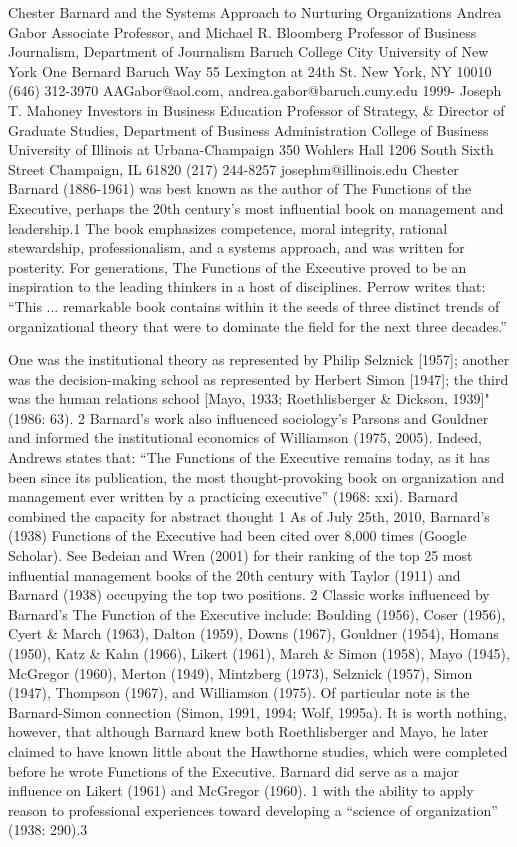 Chester Barnard and the Systems Approach to Nurturing Organizations Andrea Gabor Associate Professor, and Michael R. Bloomberg Professor of Business Journalism, Department of Journalism Baruch College City University of New York One Bernard Baruch Way 55 Lexington at 24th St. New York, NY 10010 (646) 312-3970 AAGabor@aol.com, andrea.gabor@baruch.cuny.edu 1999- Joseph T. Mahoney Investors in Business Education Professor of Strategy, \& Director of Graduate Studies, Department of Business Administration College of Business University of Illinois at Urbana-Champaign 350 Wohlers Hall 1206 South Sixth Street Champaign, IL 61820 (217) 244-8257 josephm@illinois.edu Chester Barnard (1886-1961) was best known as the author of The Functions of the Executive, perhaps the 20th century’s most influential book on management and leadership.1 The book emphasizes competence, moral integrity, rational stewardship, professionalism, and a systems approach, and was written for posterity. For generations, The Functions of the Executive proved to be an inspiration to the leading thinkers in a host of disciplines. Perrow writes that: ``This ... remarkable book contains within it the seeds of three distinct trends of organizational theory that were to dominate the field for the next three decades.''

One was the institutional theory as represented by Philip Selznick [1957]; another was the decision-making school as represented by Herbert Simon [1947]; the third was the human relations school [Mayo, 1933; Roethlisberger \& Dickson, 1939]" (1986: 63). 2 Barnard’s work also influenced sociology’s Parsons and Gouldner and informed the institutional economics of Williamson (1975, 2005). Indeed, Andrews states that: “The Functions of the Executive remains today, as it has been since its publication, the most thought-provoking book on organization and management ever written by a practicing executive” (1968: xxi). Barnard combined the capacity for abstract thought 1 As of July 25th, 2010, Barnard’s (1938) Functions of the Executive had been cited over 8,000 times (Google Scholar). See Bedeian and Wren (2001) for their ranking of the top 25 most influential management books of the 20th century with Taylor (1911) and Barnard (1938) occupying the top two positions. 2 Classic works influenced by Barnard’s The Function of the Executive include: Boulding (1956), Coser (1956), Cyert \& March (1963), Dalton (1959), Downs (1967), Gouldner (1954), Homans (1950), Katz \& Kahn (1966), Likert (1961), March \& Simon (1958), Mayo (1945), McGregor (1960), Merton (1949), Mintzberg (1973), Selznick (1957), Simon (1947), Thompson (1967), and Williamson (1975). Of particular note is the Barnard-Simon connection (Simon, 1991, 1994; Wolf, 1995a). It is worth nothing, however, that although Barnard knew both Roethlisberger and Mayo, he later claimed to have known little about the Hawthorne studies, which were completed before he wrote Functions of the Executive. Barnard did serve as a major influence on Likert (1961) and McGregor (1960). 1 with the ability to apply reason to professional experiences toward developing a “science of organization” (1938: 290).3

